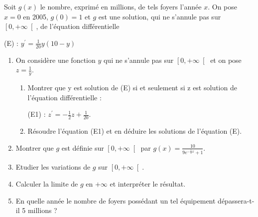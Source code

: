 Soit $g\left(x\right)$ le nombre, exprimé en millions, de tels foyers l'année $x$. On pose $x=0$ en 2005, $g\left(0\right)=1$ et $g$ est une solution, qui ne s'annule pas sur $\left[0,+\infty \right[$, de l'équation différentielle
\par
(E) : $y^{\prime}=\frac{1}{20} y \left(10-y\right)$
\begin{enumerate}
     \item
     On considère une fonction $y$ qui ne s'annule pas sur $\left[0,+\infty \right[$ et on pose $z=\frac{1}{y}$.
     \begin{enumerate}[label=\alph*.]
          \item
          Montrer que y est solution de (E) si et seulement si z est solution de l'équation différentielle :
          \par
          (E1) : $z^{\prime}=-\frac{1}{2} z+\frac{1}{20}$.
          \item
          Résoudre l'équation (E1) et en déduire les solutions de l'équation (E).
     \end{enumerate}
     \item
     Montrer que $g$ est définie sur $\left[0,+\infty \right[$ par $g\left(x\right)=\frac{10}{9e^{-\frac{1}{2}x}+1}$.
     \item
     Etudier les variations de $g$ sur $\left[0,+\infty \right[$.
     \item
     Calculer la limite de $g$ en $+\infty $ et interpréter le résultat.
     \item
     En quelle année le nombre de foyers possédant un tel équipement dépassera-t-il 5 millions ?
\end{enumerate}
